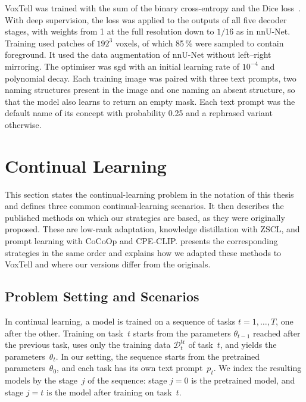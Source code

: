 VoxTell was trained with the sum of the binary cross-entropy and the Dice loss~\cite[Sec.~3, Eq.~7, Suppl.~Sec.~A]{rokuss2025voxtellfreetextpromptableuniversal}.
With deep supervision, the loss was applied to the outputs of all five decoder stages, with weights from 1 at the full resolution down to $1/16$ as in nnU-Net.
Training used patches of $192^3$ voxels, of which 85\,\% were sampled to contain foreground.
It used the data augmentation of nnU-Net without left--right mirroring.
The optimiser was \gls{sgd} with an initial learning rate of $10^{-4}$ and polynomial decay.
Each training image was paired with three text prompts, two naming structures present in the image and one naming an absent structure, so that the model also learns to return an empty mask.
Each text prompt was the default name of its concept with probability 0.25 and a rephrased variant otherwise.

\section{Continual Learning}
\label{sec:bg-cl}

This section states the continual-learning problem in the notation of this thesis and defines three common continual-learning scenarios.
It then describes the published methods on which our strategies are based, as they were originally proposed.
These are low-rank adaptation, knowledge distillation with ZSCL, and prompt learning with CoCoOp and CPE-CLIP.
 presents the corresponding strategies in the same order and explains how we adapted these methods to VoxTell and where our versions differ from the originals.

\subsection{Problem Setting and Scenarios}
\label{subsec:bg-cl-setting}

In continual learning, a model is trained on a sequence of tasks $t = 1, \dots, T$, one after the other.
Training on task~$t$ starts from the parameters $\theta_{t-1}$ reached after the previous task, uses only the training data $\mathcal{D}_t^{\mathrm{tr}}$ of task~$t$, and yields the parameters~$\theta_t$.
In our setting, the sequence starts from the pretrained parameters~$\theta_0$, and each task has its own text prompt~$p_t$.
We index the resulting models by the stage~$j$ of the sequence: stage $j = 0$ is the pretrained model, and stage $j = t$ is the model after training on task~$t$.

